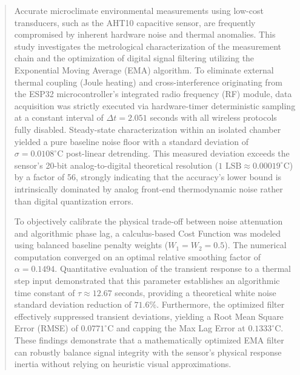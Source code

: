 \begin{abstract}
  Accurate microclimate environmental measurements using low-cost transducers, such as the AHT10 capacitive sensor, are frequently compromised by inherent hardware noise and thermal anomalies. 
  This study investigates the metrological characterization of the measurement chain and the optimization of digital signal filtering utilizing the Exponential Moving Average (EMA) algorithm. 
  To eliminate external thermal coupling (Joule heating) and cross-interference originating from the ESP32 microcontroller's integrated radio frequency (RF) module, data acquisition was strictly executed via hardware-timer deterministic sampling at a constant interval of $\Delta t = 2.051$ seconds with all wireless protocols fully disabled.
  Steady-state characterization within an isolated chamber yielded a pure baseline noise floor with a standard deviation of $\sigma = 0.0108^\circ\text{C}$ post-linear detrending. 
  This measured deviation exceeds the sensor's 20-bit analog-to-digital theoretical resolution ($1 \text{ LSB} \approx 0.00019^\circ\text{C}$) by a factor of 56, strongly indicating that the accuracy's lower bound is intrinsically dominated by analog front-end thermodynamic noise rather than digital quantization errors.

  To objectively calibrate the physical trade-off between noise attenuation and algorithmic phase lag, a calculus-based Cost Function was modeled using balanced baseline penalty weights ($W_1 = W_2 = 0.5$). 
  The numerical computation converged on an optimal relative smoothing factor of $\alpha = 0.1494$. Quantitative evaluation of the transient response to a thermal step input demonstrated that this parameter establishes an algorithmic time constant of $\tau \approx 12.67$ seconds, 
  providing a theoretical white noise standard deviation reduction of $71.6\%$. 
  Furthermore, the optimized filter effectively suppressed transient deviations, yielding a Root Mean Square Error (RMSE) of $0.0771^\circ\text{C}$ and capping the Max Lag Error at $0.1333^\circ\text{C}$. 
  These findings demonstrate that a mathematically optimized EMA filter can robustly balance signal integrity with the sensor's physical response inertia without relying on heuristic visual approximations.
\end{abstract}